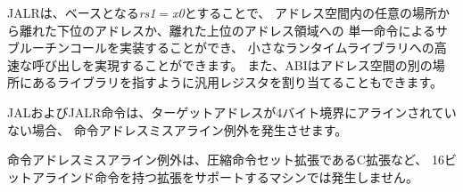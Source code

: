 \begin{commentary}
\begin{comment}
When used with a base {\em rs1}$=${\tt x0}, JALR can be used to implement
a single instruction subroutine call to the lowest \wunits{2}{KiB} or highest
\wunits{2}{KiB} address region from anywhere in the address space, which could
be used to implement fast calls to a small runtime library.  Alternatively,
an ABI could dedicate a general-purpose register to point to a library
elsewhere in the address space.
\end{comment}

JALRは、ベースとなる{\em rs1}$=${\em x0}とすることで、
アドレス空間内の任意の場所から離れた下位のアドレスか、離れた上位のアドレス領域への
単一命令によるサブルーチンコールを実装することができ、
小さなランタイムライブラリへの高速な呼び出しを実現することができます。
また、ABIはアドレス空間の別の場所にあるライブラリを指すように汎用レジスタを割り当てることもできます。
\end{commentary}

\begin{comment}
The JAL and JALR instructions will generate an
instruction-address-misaligned exception if the target address is not
aligned to a four-byte boundary.
\end{comment}
JALおよびJALR命令は、ターゲットアドレスが4バイト境界にアラインされていない場合、
命令アドレスミスアライン例外を発生させます。

\begin{commentary}
\begin{comment}
Instruction-address-misaligned exceptions are not possible on machines
that support extensions with 16-bit aligned instructions, such as the
compressed instruction-set extension, C.
\end{comment}

命令アドレスミスアライン例外は、圧縮命令セット拡張であるC拡張など、
16ビットアラインド命令を持つ拡張をサポートするマシンでは発生しません。

\end{commentary}

\begin{comment}
Return-address prediction stacks are a common feature of
high-performance instruction-fetch units, but require accurate
detection of instructions used for procedure calls and returns to be
effective.  For RISC-V, hints as to the instructions' usage are encoded
implicitly via the register numbers used.  A JAL instruction should
push the return address onto a return-address stack (RAS) only when
{\em rd} is {\tt x1} or {\tt x5}.  JALR instructions should push/pop a
RAS as shown in the Table~\ref{rashints}.
\end{comment}

